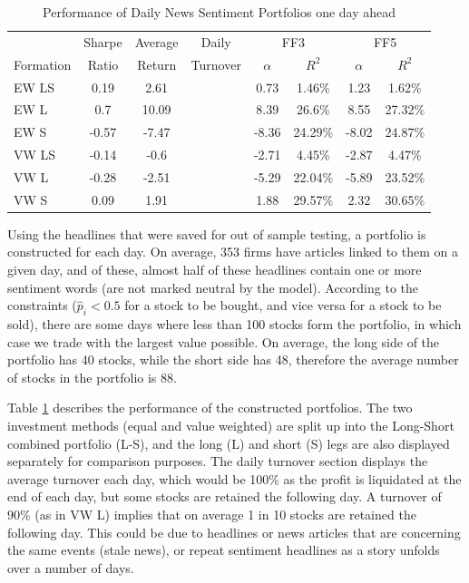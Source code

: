 \begin{table}[!ht]
\begin{center}
\begin{tabular}{lccccccc}
      \toprule
      & Sharpe &  Average & Daily & \multicolumn{2}{c}{FF3} & \multicolumn{2}{c}{FF5} \\
      \cmidrule(lr){5-6}
      \cmidrule(lr){7-8}
      Formation & Ratio & Return & Turnover & $\alpha$ & $R^2$ & $\alpha$ & $R^2$ \\
      \midrule
      EW LS & 0.19 & 2.61 & & 0.73 & 1.46\% & 1.23 & 1.62\% \\
      EW L & 0.7 & 10.09 & & 8.39 & 26.6\% & 8.55 & 27.32\% \\
      EW S & -0.57 & -7.47 & & -8.36 & 24.29\% & -8.02 & 24.87\% \\
      VW LS & -0.14 & -0.6 & & -2.71 & 4.45\% & -2.87 & 4.47\% \\
      VW L & -0.28 & -2.51 & & -5.29 & 22.04\% & -5.89 & 23.52\% \\
      VW S & 0.09 & 1.91 & & 1.88 & 29.57\% & 2.32 & 30.65\% \\
      \bottomrule
\end{tabular}
\caption{Performance of Daily News Sentiment Portfolios one day ahead}
\label{portfolio-performance}
\end{center}
\end{table}


Using the headlines that were saved for out of sample testing, a portfolio is constructed for each day. On average, 353 firms have articles linked to them on a given day, and of these, almost half of these headlines contain one or more sentiment words (are not marked neutral by the model). According to the constraints ($\widehat p_i < 0.5$ for a stock to be bought, and vice versa for a stock to be sold), there are some days where less than 100 stocks form the portfolio, in which case we trade with the largest value possible. On average, the long side of the portfolio has 40 stocks, while the short side has 48, therefore the average number of stocks in the portfolio is 88.

Table \ref{portfolio-performance} describes the performance of the constructed portfolios. The two investment methods (equal and value weighted) are split up into the Long-Short combined portfolio (L-S), and the long (L) and short (S) legs are also displayed separately for comparison purposes. The daily turnover section displays the average turnover each day, which would be 100\% as the profit is liquidated at the end of each day, but some stocks are retained the following day. A turnover of 90\% (as in VW L) implies that on average 1 in 10 stocks are retained the following day. This could be due to headlines or news articles that are concerning the same events (stale news), or repeat sentiment headlines as a story unfolds over a number of days.

